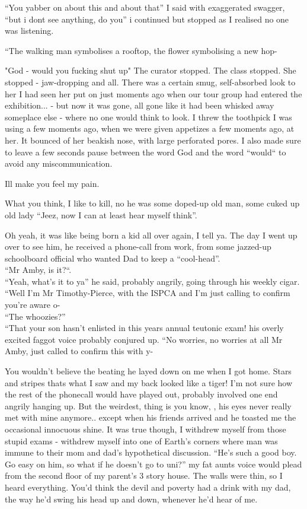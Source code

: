 \documentclass[19pt,openany]{book}
\begin{document}
``You yabber on about this and
about that'' I said with exaggerated
swagger, ``but i dont see anything,
do you'' i continued but stopped
as I realised no one was listening.

``The walking man symbolises a
rooftop, the flower symbolising
a new hop-

"God - would you fucking shut up"
The curator stopped.
The class stopped. She stopped -
jaw-dropping and all. There
was a certain smug, self-absorbed
look to her I had seen her put on just
moments ago when
our tour group had
entered the exhibition... - but now it was gone,
all gone like it had been whisked
away someplace else - where
no one would think to look. I threw the toothpick
I was using a few moments
ago, when we were given appetizes
a few moments ago, at her.
It bounced of her beakish nose,
with large perforated pores.
I also made sure to leave
a few seconds pause between
the word God and the word
``would`` to avoid
any miscommunication.

Ill make you feel my pain.

What you think, I like
to kill, no he was
some doped-up old man,
some cuked up old lady
``Jeez,
now I can at least hear myself
think''.

Oh yeah, it was like being
born a kid all
over again, I tell ya. The day I went
up over to see him, he received
a phone-call from work,
from some jazzed-up schoolboard official
who wanted Dad to keep a ``cool-head''.\\
``Mr Amby, is it?``.\\
``Yeah, what's it to ya'' he said, probably
angrily, going through his weekly cigar.\\
``Well I'm Mr Timothy-Pierce, with the ISPCA
and I'm just calling to confirm you're aware o-\\
``The whoozies?''\\
``That your son hasn't enlisted in this years
annual teutonic exam! his overly excited
faggot voice probably conjured up. ``No worries,
no worries at all Mr Amby, just called to confirm
this with y-

You wouldn't believe the beating he layed down on me
when I got home. Stars and stripes thats what I saw
and my back looked like a tiger!
I'm not sure how the rest of the phonecall would
have played out, probably
involved one end angrily hanging up.
But the weirdest, thing is you know,
, his eyes never really
met with mine anymore.. except when his friends arrived
and he toasted me the occasional innocuous shine. It
was true though, I withdrew myself from those
stupid exams - withdrew myself into one of Earth's
corners where man was immune to
their mom and dad's hypothetical discussion.
``He's such a good boy. Go easy on him, so what
if he doesn't go to uni?'' my fat aunts voice would
plead from the second floor of my parent's 3 story house.
The walls were thin, so I heard everything. You'd think
the devil and poverty had a drink with my dad,
the way he'd swing his head up and down,
whenever he'd hear of me.
\end{document}
